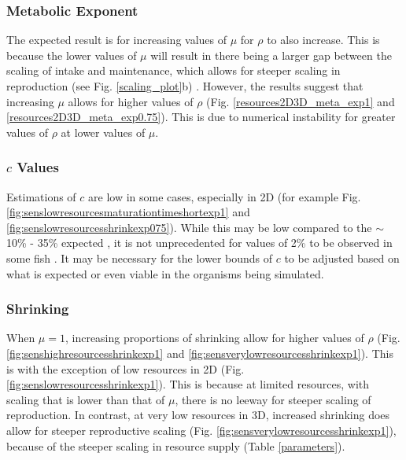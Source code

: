 \documentclass[a4paper, 11pt, hidelinks]{article} %
\begin{document}
	\subsubsection{Metabolic Exponent}
	The expected result is for increasing values of $\mu$ for $\rho$ to also increase.  This is because the lower values of $\mu$ will result in there being a larger gap between the scaling of intake and maintenance, which allows for steeper scaling in reproduction (see Fig. \ref{scaling_plot}b) \parencite{Marshall2019}.  
	However, the results suggest that increasing $\mu$ allows for higher values of $\rho$ (Fig. \ref{resources2D3D_meta_exp1} and \ref{resources2D3D_meta_exp0.75}).  This is due to numerical instability for greater values of $ \rho $ at lower values of $ \mu $.
		
	\subsubsection{$c$ Values}
	Estimations of $c$ are low in some cases, especially in 2D (for example Fig. \ref{fig:senslowresourcesmaturationtimeshortexp1} and \ref{fig:senslowresourcesshrinkexp075}).  While this may be low compared to the $\sim$10\% - 35\% expected \parencite{Benoit2018, Fontoura2009, Roff1983, Wootton1985}, it is not unprecedented for values of 2\% to be observed in some fish \parencite{Gunderson1997}.  
	It may be necessary for the lower bounds of $c$ to be adjusted based on what is expected or even viable in the organisms being simulated.
		
	\subsubsection{Shrinking}
	When $ \mu = 1$, increasing proportions of shrinking allow for higher values of $ \rho $ (Fig. \ref{fig:senshighresourcesshrinkexp1} and \ref{fig:sensverylowresourcesshrinkexp1}).  This is with the exception of low resources in 2D (Fig. \ref{fig:senslowresourcesshrinkexp1}).  This is because at limited resources, with scaling that is lower than that of $ \mu $, there is no leeway for steeper scaling of reproduction.  In contrast, at very low resources in 3D, increased shrinking does allow for steeper reproductive scaling (Fig. \ref{fig:sensverylowresourcesshrinkexp1}), because of the steeper scaling in resource supply (Table \ref{parameters}).
	
\end{document}
